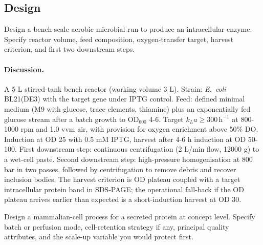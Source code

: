\subsection*{Design}

\begin{exercise}
Design a bench-scale aerobic microbial run to produce an intracellular
enzyme. Specify reactor volume, feed composition, oxygen-transfer
target, harvest criterion, and first two downstream steps.
\end{exercise}

\paragraph{Discussion.}
A 5 L stirred-tank bench reactor (working volume 3 L). Strain:
\emph{E.\ coli} BL21(DE3) with the target gene under IPTG control.
Feed: defined minimal medium (M9 with glucose, trace elements,
thiamine) plus an exponentially fed glucose stream after a batch growth
to OD$_{600}$ 4-6. Target $k_L a \ge 300\,\text{h}^{-1}$ at
800-1000 rpm and 1.0 vvm air, with provision for oxygen enrichment
above 50\% DO. Induction at OD 25 with 0.5 mM IPTG, harvest after
4-6 h induction at OD 50-100. First downstream step: continuous
centrifugation (2 L/min flow, 12000 g) to a wet-cell paste. Second
downstream step: high-pressure homogenisation at 800 bar in two
passes, followed by centrifugation to remove debris and recover
inclusion bodies. The harvest criterion is OD plateau coupled with a
target intracellular protein band in SDS-PAGE; the operational
fall-back if the OD plateau arrives earlier than expected is a
short-induction harvest at OD 30.

\begin{exercise}
Design a mammalian-cell process for a secreted protein at concept
level. Specify batch or perfusion mode, cell-retention strategy if any,
principal quality attributes, and the scale-up variable you would
protect first.
\end{exercise}

